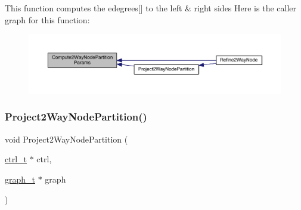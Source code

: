 This function computes the edegrees\mbox{[}\mbox{]} to the left \& right sides Here is the caller graph for this function\+:\nopagebreak
\begin{figure}[H]
\begin{center}
\leavevmode
\includegraphics[width=350pt]{a00278_a66257f7c528ad75c86244ef3794d1ae5_icgraph}
\end{center}
\end{figure}
\mbox{\label{a00278_ab3d791e7adffa770602e257ecdaabd72}} 
\subsubsection{\texorpdfstring{Project2\+Way\+Node\+Partition()}{Project2WayNodePartition()}}
{\footnotesize\ttfamily void Project2\+Way\+Node\+Partition (\begin{DoxyParamCaption}\item[{\hyperlink{a00742}{ctrl\+\_\+t} $\ast$}]{ctrl,  }\item[{\hyperlink{a00734}{graph\+\_\+t} $\ast$}]{graph }\end{DoxyParamCaption})}

